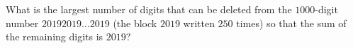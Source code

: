 What is the largest number of digits that can be deleted from the $1000$-digit number $20192019\ldots2019$ (the block $2019$ written $250$ times) so that the sum of the remaining digits is $2019$?
